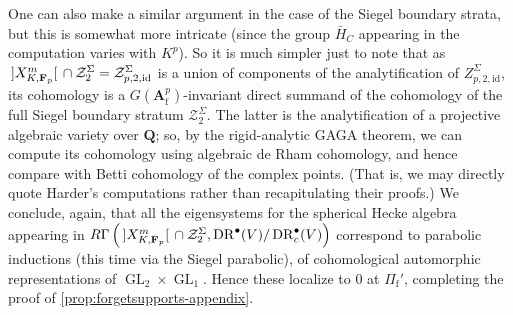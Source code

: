 \documentclass[cjm]{ipart}
\theoremstyle{plain}
\theoremstyle{remark}
\DeclareMathOperator{\DR}{DR}
\DeclareMathOperator{\GL}{GL}
\DeclarePairedDelimiter{\tb}{{\,]}}{{[\, }} %
\newcommand{\Af}{\AA_{\mathrm{f}}}
\newcommand{\Fp}{\mathbf{F}_p}
\newcommand{\Pif}{\Pi_{\mathrm{f}}}
\newcommand{\QQ}{\mathbf{Q}}
\newcommand{\cZ}{\mathcal{Z}}
\renewcommand{\AA}{\mathbf{A}}
\numberwithin{equation}{subsection}
\begin{document}
  One can also make a similar argument in the case of the Siegel boundary strata, but this is somewhat more intricate (since the group $\bar{H}_C$ appearing in the computation varies with $K^p$). So it is much simpler just to note that as $\tb{X_{K, \Fp}^{m}} \cap \mathcal{Z}_2^{\Sigma} = \mathcal{Z}_{p, 2, \mathrm{id}}^{\Sigma}$ is a union of components of the analytification of $Z^{\Sigma}_{p, 2, \mathrm{id}}$, its cohomology is a $G(\Af^p)$-invariant direct summand of the cohomology of the full Siegel boundary stratum $\cZ_2^{\Sigma}$. The latter is the analytification of a projective algebraic variety over $\QQ$; so, by the rigid-analytic GAGA theorem, we can compute its cohomology using algebraic de Rham cohomology, and hence compare with Betti cohomology of the complex points. (That is, we may directly quote Harder's computations rather than recapitulating their proofs.) We conclude, again, that all the eigensystems for the spherical Hecke algebra appearing in $R\Gamma\left(\tb{X_{K, \Fp}^{m}} \cap \mathcal{Z}_2^{\Sigma}, \DR^\bullet(V)/\DR^\bullet_c(V)\right)$ correspond to parabolic inductions (this time via the Siegel parabolic), of cohomological automorphic representations of $\GL_2 \times \GL_1$. Hence these localize to 0 at $\Pif'$, completing the proof of \cref{prop:forgetsupports-appendix}.
  
\end{document}
